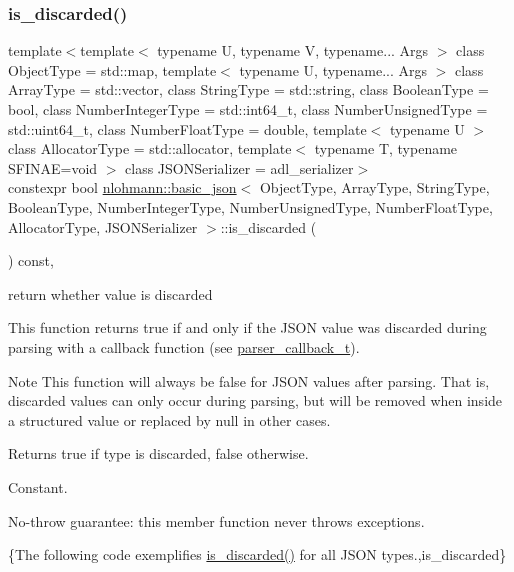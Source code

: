 \subsubsection{\texorpdfstring{is\+\_\+discarded()}{is\_discarded()}}
{\footnotesize\ttfamily template$<$template$<$ typename U, typename V, typename... Args $>$ class Object\+Type = std\+::map, template$<$ typename U, typename... Args $>$ class Array\+Type = std\+::vector, class String\+Type  = std\+::string, class Boolean\+Type  = bool, class Number\+Integer\+Type  = std\+::int64\+\_\+t, class Number\+Unsigned\+Type  = std\+::uint64\+\_\+t, class Number\+Float\+Type  = double, template$<$ typename U $>$ class Allocator\+Type = std\+::allocator, template$<$ typename T, typename S\+F\+I\+N\+A\+E=void $>$ class J\+S\+O\+N\+Serializer = adl\+\_\+serializer$>$ \\
constexpr bool \mbox{\hyperlink{classnlohmann_1_1basic__json}{nlohmann\+::basic\+\_\+json}}$<$ Object\+Type, Array\+Type, String\+Type, Boolean\+Type, Number\+Integer\+Type, Number\+Unsigned\+Type, Number\+Float\+Type, Allocator\+Type, J\+S\+O\+N\+Serializer $>$\+::is\+\_\+discarded (\begin{DoxyParamCaption}{ }\end{DoxyParamCaption}) const\hspace{0.3cm}{\ttfamily [inline]}, {\ttfamily [noexcept]}}



return whether value is discarded 

This function returns true if and only if the J\+S\+ON value was discarded during parsing with a callback function (see \mbox{\hyperlink{classnlohmann_1_1basic__json_ab4f78c5f9fd25172eeec84482e03f5b7}{parser\+\_\+callback\+\_\+t}}).

\begin{DoxyNote}{Note}
This function will always be {\ttfamily false} for J\+S\+ON values after parsing. That is, discarded values can only occur during parsing, but will be removed when inside a structured value or replaced by null in other cases.
\end{DoxyNote}
\begin{DoxyReturn}{Returns}
{\ttfamily true} if type is discarded, {\ttfamily false} otherwise.
\end{DoxyReturn}
Constant.

No-\/throw guarantee\+: this member function never throws exceptions.

\{The following code exemplifies {\ttfamily \mbox{\hyperlink{classnlohmann_1_1basic__json_aabe623bc8304c2ba92d96d91f390fab4}{is\+\_\+discarded()}}} for all J\+S\+ON types.,is\+\_\+discarded\}

